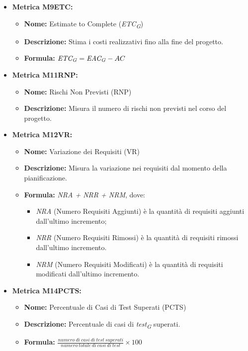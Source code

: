 \begin{itemize}
    \item \textbf{Metrica M9ETC:}
          \begin{itemize}
              \item \textbf{Nome:} Estimate to Complete (\textit{ETC}\textsubscript{\textit{G}})
              \item \textbf{Descrizione:} Stima i costi realizzativi fino alla fine del progetto.
              \item \textbf{Formula:} $\textit{ETC}\textsubscript{\textit{G}} = \textit{EAC}\textsubscript{\textit{G}} - AC$
          \end{itemize}

    \item \textbf{Metrica M11RNP:}
          \begin{itemize}
              \item \textbf{Nome:} Rischi Non Previsti (RNP)
              \item \textbf{Descrizione:} Misura il numero di rischi non previsti nel corso del progetto.
          \end{itemize}

    \item \textbf{Metrica M12VR:}
          \begin{itemize}
              \item \textbf{Nome:} Variazione dei Requisiti (VR)
              \item \textbf{Descrizione:} Misura la variazione nei requisiti dal momento della pianificazione.
              \item \textbf{Formula:} \textit{NRA + NRR + NRM}, dove:\begin{itemize}
                \item \textit{NRA} (Numero Requisiti Aggiunti) è la quantità di requisiti aggiunti dall'ultimo incremento;
                \item \textit{NRR} (Numero Requisiti Rimossi) è la quantità di requisiti rimossi dall'ultimo incremento.
                \item \textit{NRM} (Numero Requisiti Modificati) è la quantità di requisiti modificati dall'ultimo incremento.
              \end{itemize}
          \end{itemize}
    
    \item \textbf{Metrica M14PCTS:}
          \begin{itemize}
           \item \textbf{Nome:} Percentuale di Casi di Test Superati (PCTS)
           \item \textbf{Descrizione:} Percentuale di casi di \textit{test}\textsubscript{\textit{G}} superati.
           \item \textbf{Formula:} $\frac{numero \ di \ casi \ di \ test \ superati}{numero \ totale \ di \ casi \ di \ test}\times 100$
          \end{itemize}


\end{itemize}
